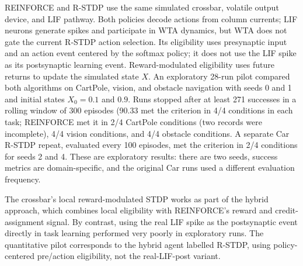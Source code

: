 REINFORCE and R-STDP use the same simulated crossbar, volatile output device,
and LIF pathway. Both policies decode actions from column currents; LIF
neurons generate spikes and participate in WTA dynamics, but WTA does not
gate the current R-STDP action selection. Its eligibility uses presynaptic
input and an action event centered by the softmax policy; it does not use the
LIF spike as its postsynaptic learning event. Reward-modulated eligibility
uses future returns to update the simulated state $X$. An exploratory 28-run
pilot compared both algorithms on CartPole, vision, and obstacle navigation
with seeds 0 and 1 and initial states $X_0=0.1$ and $0.9$. Runs stopped after
at least 271 successes in a rolling window of 300 episodes (90.33%
met the criterion in 4/4 conditions in each task; REINFORCE met it in 2/4
CartPole conditions (two records were incomplete), 4/4 vision conditions,
and 4/4 obstacle conditions. A separate Car R-STDP repeat, evaluated every
100 episodes, met the criterion in 2/4 conditions for seeds 2 and 4. These
are exploratory results: there are two seeds, success metrics are
domain-specific, and the original Car runs used a different evaluation
frequency.

The crossbar's local reward-modulated STDP works as part of the hybrid
approach, which combines local eligibility with REINFORCE's reward and
credit-assignment signal. By contrast, using the real LIF spike as the
postsynaptic event directly in task learning performed very poorly in
exploratory runs. The quantitative pilot corresponds to the hybrid agent
labelled R-STDP, using policy-centered pre/action eligibility, not the
real-LIF-post variant.
